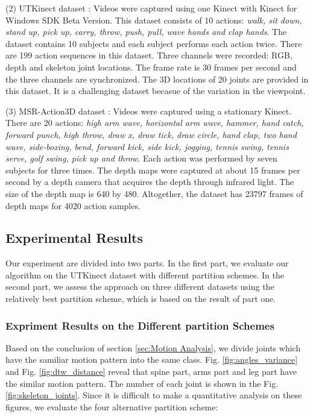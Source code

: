 \documentclass[conference]{IEEEtran}
\begin{document}
		(2) UTKinect dataset \cite{hostogram_of_3d_joints}:
		Videos were captured using one Kinect with Kinect for Windows SDK Beta Version.
		This dataset consists of 10 actions: \textit{walk, sit down, stand up, pick up, carry, throw, push, pull, wave hands and clap hands}.
		The dataset contains 10 subjects and each subject performs each action twice.
		There are 199 action sequences in this dataset.
		Three channels were recorded: RGB, depth and skeleton joint locations.
		The frame rate is 30 frames per second and the three channels are synchronized.
		The 3D locations of 20 joints are provided in this dataset.
		It is a challenging dataset becasue of the variation in the viewpoint.
		
		(3) MSR-Action3D dataset \cite{MSR3D_dataset}:
		Videos were captured using a stationary Kinect.
		There are 20 actions: \textit{high arm wave, horizontal arm wave, hammer, hand catch, forward punch, high throw, draw x, draw tick, draw circle, hand clap, two hand wave, side-boxing, bend, forward kick, side kick, jogging, tennis swing, tennis serve, golf swing, pick up and throw}.
		Each action was performed by seven subjects for three times.
		The depth maps were captured at about 15 frames per second by a depth camera that acquires the depth through infrared light.
		The size of the depth map is 640 by 480.
		Altogether, the dataset has 23797 frames of depth maps for 4020 action samples.
		
	\subsection{Experimental Results}
		Our experiment are divided into two parts. 
		In the first part, we evaluate our algorithm on the UTKinect dataset \cite{hostogram_of_3d_joints} with different partition schemes.
		In the second part, we assess the approach on three different datasets using the relatively best partition scheme, which is based on the result of part one.
		\subsubsection{Expriment Results on the Different partition Schemes}
			Based on the conclusion of section \ref{sec:Motion Analysis}, we divide joints which have the samiliar motion pattern into the same class.
			Fig. \ref{fig:angles_variance} and Fig. \ref{fig:dtw_distance} reveal that spine part, arms part and leg part have the similar motion pattern.
			The number of each joint is shown in the Fig. \ref{fig:skeleton_joints}.
			Since it is difficult to make a quantitative analysis on these figures, we evaluate the four alternative partition scheme:
			
\end{document}
